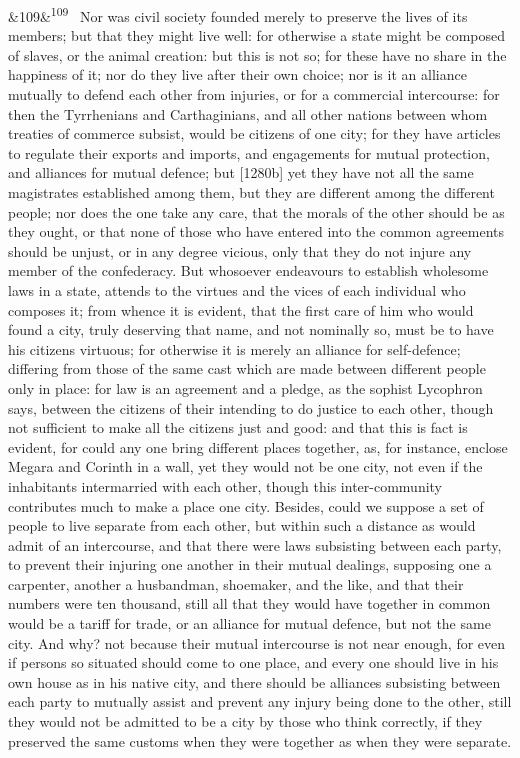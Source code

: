 \documentclass[12pt]{article}
\newcommand{\para}[1][]{\par\noindent\ifx&#1&\else\textsuperscript{\footnotesize #1}~\fi}
\begin{document}
\para[109] Nor was civil society founded merely to preserve the lives of its members; but that they might live well: for otherwise a state might be composed of slaves, or the animal creation: but this is not so; for these have no share in the happiness of it; nor do they live after their own choice; nor is it an alliance mutually to defend each other from injuries, or for a commercial intercourse: for then the Tyrrhenians and Carthaginians, and all other nations between whom treaties of commerce subsist, would be citizens of one city; for they have articles to regulate their exports and imports, and engagements for mutual protection, and alliances for mutual defence; but [1280b] yet they have not all the same magistrates established among them, but they are different among the different people; nor does the one take any care, that the morals of the other should be as they ought, or that none of those who have entered into the common agreements should be unjust, or in any degree vicious, only that they do not injure any member of the confederacy. But whosoever endeavours to establish wholesome laws in a state, attends to the virtues and the vices of each individual who composes it; from whence it is evident, that the first care of him who would found a city, truly deserving that name, and not nominally so, must be to have his citizens virtuous; for otherwise it is merely an alliance for self-defence; differing from those of the same cast which are made between different people only in place: for law is an agreement and a pledge, as the sophist Lycophron says, between the citizens of their intending to do justice to each other, though not sufficient to make all the citizens just and good: and that this is fact is evident, for could any one bring different places together, as, for instance, enclose Megara and Corinth in a wall, yet they would not be one city, not even if the inhabitants intermarried with each other, though this inter-community contributes much to make a place one city. Besides, could we suppose a set of people to live separate from each other, but within such a distance as would admit of an intercourse, and that there were laws subsisting between each party, to prevent their injuring one another in their mutual dealings, supposing one a carpenter, another a husbandman, shoemaker, and the like, and that their numbers were ten thousand, still all that they would have together in common would be a tariff for trade, or an alliance for mutual defence, but not the same city. And why? not because their mutual intercourse is not near enough, for even if persons so situated should come to one place, and every one should live in his own house as in his native city, and there should be alliances subsisting between each party to mutually assist and prevent any injury being done to the other, still they would not be admitted to be a city by those who think correctly, if they preserved the same customs when they were together as when they were separate.
\end{document}
